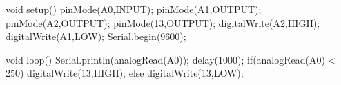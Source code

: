 void setup() {
pinMode(A0,INPUT);
pinMode(A1,OUTPUT);
pinMode(A2,OUTPUT);
pinMode(13,OUTPUT);
digitalWrite(A2,HIGH);
digitalWrite(A1,LOW);
Serial.begin(9600);
}

void loop() {
Serial.println(analogRead(A0));
delay(1000);
if(analogRead(A0) < 250){
digitalWrite(13,HIGH);
}
else{
digitalWrite(13,LOW);
}
}